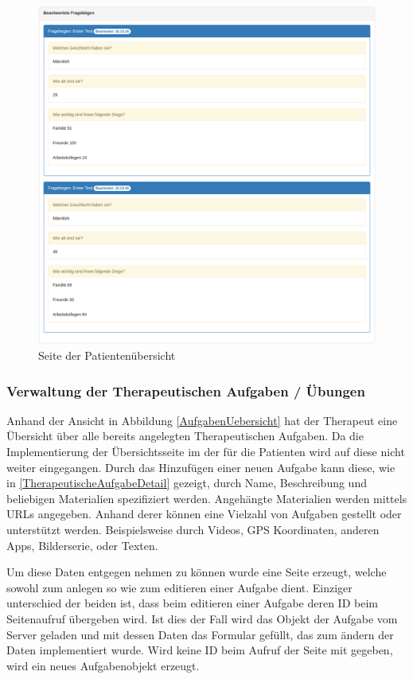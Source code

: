 \begin{figure}[H]
	\centering
	\includegraphics[scale=0.3]{images/Screenshots/PatientDetailsFrageboegen}
	\caption[Seite der Patientenübersicht]{Seite der Patientenübersicht}
	\label{PatientDetailsFrageboegen}
\end{figure}

\newpage

\subsubsection{Verwaltung der Therapeutischen Aufgaben / Übungen}\label{_ImpTCAufgaben}

Anhand der Ansicht in Abbildung \ref{AufgabenUebersicht} hat der Therapeut eine Übersicht über alle bereits angelegten Therapeutischen Aufgaben. Da die Implementierung der Übersichtsseite im der für die Patienten wird auf diese nicht weiter eingegangen. Durch das Hinzufügen einer neuen Aufgabe kann diese, wie in \ref{TherapeutischeAufgabeDetail} gezeigt, durch Name, Beschreibung und beliebigen Materialien spezifiziert werden. Angehängte Materialien werden mittels URLs angegeben. Anhand derer können eine Vielzahl von Aufgaben gestellt oder unterstützt werden. Beispielsweise durch Videos, GPS Koordinaten, anderen Apps, Bilderserie, oder Texten.

Um diese Daten entgegen nehmen zu können wurde eine Seite erzeugt, welche sowohl zum anlegen so wie zum editieren einer Aufgabe dient. Einziger unterschied der beiden ist, dass beim editieren einer Aufgabe deren ID beim Seitenaufruf übergeben wird. Ist dies der Fall wird das Objekt der Aufgabe vom Server geladen und mit dessen Daten das Formular gefüllt, das zum ändern der Daten implementiert wurde. Wird keine ID beim Aufruf der Seite mit gegeben, wird ein neues Aufgabenobjekt erzeugt.

